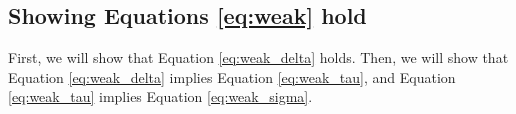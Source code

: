 \subsection{Showing Equations \ref{eq:weak} hold}
First, we will show that Equation 
\ref{eq:weak_delta} holds. Then, we will 
show that Equation 
\ref{eq:weak_delta} implies Equation 
\ref{eq:weak_tau}, and Equation \ref{eq:weak_tau} 
implies Equation \ref{eq:weak_sigma}.